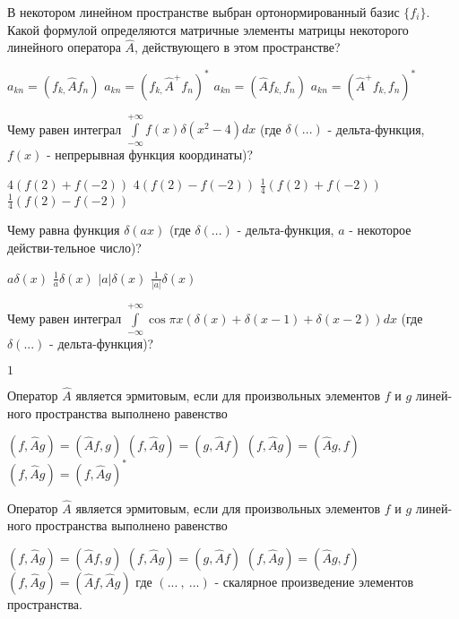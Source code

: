 \documentclass[11pt,a4paper]{exam}
\begin{document}
\begin{questions}
\question В некотором линейном пространстве выбран ортонормированный базис $\{{{f}_{i}}\}$. Какой формулой определяются матричные элементы матрицы некоторого линейного оператора $\hat{A}$, действующего в этом пространстве?
\begin{choices}
\choice ${{a}_{kn}}=({{f}_{k,}}\hat{A}{{f}_{n}})$  
\choice ${{a}_{kn}}={{({{f}_{k,}}{{\hat{A}}^{+}}{{f}_{n}})}^{*}}$ 
\choice ${{a}_{kn}}=(\hat{A}{{f}_{k,}}{{f}_{n}})$  
\choice ${{a}_{kn}}={{({{\hat{A}}^{+}}{{f}_{k,}}{{f}_{n}})}^{*}}$
\end{choices}

\question Чему равен интеграл $\int\limits_{-\infty }^{+\infty }{f(x)\delta ({{x}^{2}}-4)dx}$ (где $\delta (...)$ - дельта-функция, $f(x)$ - непрерывная функция координаты)?
\begin{choices}
\choice $4\left( f(2)+f(-2) \right)$      
\choice $4\left( f(2)-f(-2) \right)$      
\choice $\frac{1}{4}\left( f(2)+f(-2) \right)$      
\choice $\frac{1}{4}\left( f(2)-f(-2) \right)$
\end{choices}

\question Чему равна функция $\delta (ax)$ (где $\delta (...)$ - дельта-функция, $a$ - некоторое действи-тельное число)?
\begin{choices}
\choice $a\delta (x)$      
\choice $\frac{1}{a}\delta (x)$     
\choice $|a|\delta (x)$    
\choice $\frac{1}{|a|}\delta (x)$ 
\end{choices}

\question Чему равен интеграл $\int\limits_{-\infty }^{+\infty }{\cos \pi x\left( \delta (x)+\delta (x-1)+\delta (x-2) \right)dx}$ (где $\delta (...)$ - дельта-функция)?
\begin{choices}
\choice $1$       
\end{choices}

\question Оператор $\hat{A}$ является эрмитовым, если для произвольных элементов $f$ и $g$ линей-ного пространства выполнено равенство
\begin{choices}
\choice $\left( f,\hat{A}g \right)=\left( \hat{A}f,g \right)$     
\choice $\left( f,\hat{A}g \right)=\left( g,\hat{A}f \right)$     
\choice $\left( f,\hat{A}g \right)=\left( \hat{A}g,f \right)$      
\choice $\left( f,\hat{A}g \right)={{\left( f,\hat{A}g \right)}^{*}}$
\end{choices}

\question Оператор $\hat{A}$ является эрмитовым, если для произвольных элементов $f$ и $g$ линей-ного пространства выполнено равенство
\begin{choices}
\choice $\left( f,\hat{A}g \right)=\left( \hat{A}f,g \right)$     
\choice $\left( f,\hat{A}g \right)=\left( g,\hat{A}f \right)$     
\choice $\left( f,\hat{A}g \right)=\left( \hat{A}g,f \right)$      
\choice $\left( f,\hat{A}g \right)=\left( \hat{A}f,\hat{A}g \right)$
где $\left( ...\ ,\ ... \right)$ - скалярное произведение элементов пространства.
\end{choices}


\end{questions}
\end{document}
